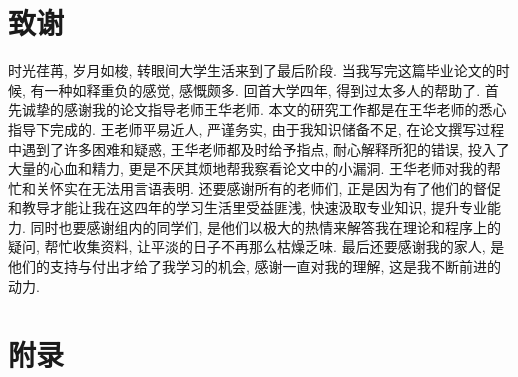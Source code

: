 \documentclass[a4paper,UTF8,titlepage]{ctexart}
\begin{document}
\section*{致谢}

时光荏苒, 岁月如梭, 转眼间大学生活来到了最后阶段. 当我写完这篇毕业论文的时候, 有一种如释重负的感觉, 感慨颇多. 回首大学四年, 得到过太多人的帮助了. 首先诚挚的感谢我的论文指导老师王华老师. 本文的研究工作都是在王华老师的悉心指导下完成的. 王老师平易近人, 严谨务实, 由于我知识储备不足, 在论文撰写过程中遇到了许多困难和疑惑, 王华老师都及时给予指点, 耐心解释所犯的错误, 投入了大量的心血和精力, 更是不厌其烦地帮我察看论文中的小漏洞. 王华老师对我的帮忙和关怀实在无法用言语表明. 还要感谢所有的老师们, 正是因为有了他们的督促和教导才能让我在这四年的学习生活里受益匪浅, 快速汲取专业知识, 提升专业能力. 同时也要感谢组内的同学们, 是他们以极大的热情来解答我在理论和程序上的疑问, 帮忙收集资料, 让平淡的日子不再那么枯燥乏味. 最后还要感谢我的家人, 是他们的支持与付出才给了我学习的机会, 感谢一直对我的理解, 这是我不断前进的动力. 

\newpage

\appendix
\section{附录}




\end{document}
